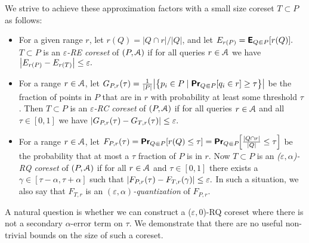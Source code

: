 \documentclass[11pt]{myclass}
\newcommand{\eps}{\varepsilon}
\newcommand{\Eu}[1]{\ensuremath{\EuScript{#1}}}
\newcommand{\E}{\textbf{\textsf{E}}}
\renewcommand{\Pr}{\textbf{\textsf{Pr}}}
\newcommand{\RC}{\textsf{RC}\xspace}
\newcommand{\RE}{\textsf{RE}\xspace}
\newcommand{\RQ}{\textsf{RQ}\xspace}
\newcommand{\denselist}{\vspace{-.1in} \itemsep -2pt\parsep=-1pt\partopsep -2pt}
\begin{document}
We strive to achieve these approximation factors with a small size coreset $T \subset P$ as follows: 
\begin{itemize}\denselist
\item [\RE:]
For a given range $r$, let $r(Q) = |Q \cap r|/|Q|$, and let 
$\begin{displaystyle}
E_{r(P)} = \E_{Q \Subset P}[r(Q)].
\end{displaystyle}$
$T \subset P$ is an \emph{$\eps$-\RE coreset} of $(P, \Eu{A})$ if for all queries $r \in \Eu{A}$  we have
$\begin{displaystyle}
\left| E_{r(P)} - E_{r(T)} \right| \leq \eps.  
\end{displaystyle}$
\item [\RC:]
For a range $r \in \Eu{A}$, let 
$
G_{P,r}(\tau) = \frac{1}{|P|} \big|\big\{p_i \in P \mid \Pr_{Q \Subset P}[q_i \in r] \geq \tau\big\} \big|
$
be the fraction of points in $P$ that are in $r$ with probability at least some threshold $\tau$.  
Then $T \subset P$ is an \emph{$\eps$-\RC coreset} of $(P,\Eu{A})$ if for all queries $r \in \Eu{A}$ and all $\tau \in [0,1]$ we have
$\begin{displaystyle}
\left| G_{P,r}(\tau) - G_{T,r}(\tau) \right| \leq \eps.  
\end{displaystyle}$
\item [\RQ:]
For a range $r \in \Eu{A}$, let 
$
F_{P,r}(\tau) = \Pr_{Q \Subset P} [r(Q) \leq \tau] = \Pr_{Q \Subset P} \hspace{-1mm}\left[\frac{|Q \cap r|}{|Q|} \leq \tau\right]
$
be the probability that at most a $\tau$ fraction of $P$ is in $r$.  
Now $T \subset P$ is an \emph{($\eps,\alpha$)-\RQ coreset} of $(P,\Eu{A})$ if for all $r \in \Eu{A}$  and $\tau \in [0,1]$ there exists a $\gamma \in [\tau - \alpha, \tau + \alpha]$ such that 
$\begin{displaystyle}
\left| F_{P,r}(\tau) - F_{T,r}(\gamma) \right| \leq \eps.
\end{displaystyle}$
In such a situation, we also say that $F_{T,r}$ is an \emph{$(\eps,\alpha)$-quantization} of $F_{P,r}$.  
\end{itemize}

\vspace{-0mm}
A natural question is whether we can construct a ($\eps,0$)-\RQ coreset where there is not a secondary $\alpha$-error term on $\tau$.  We demonstrate that there are no useful non-trivial bounds on the size of such a coreset.    
\end{document}
